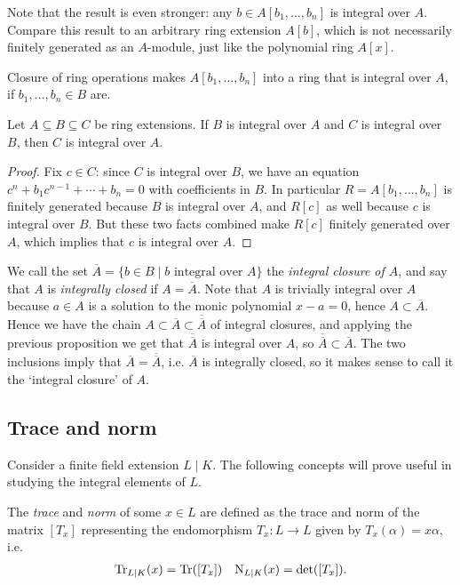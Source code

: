 Note that the result is even stronger: any $b\in A[b_1,\dots,b_n]$ is integral over $A$. Compare this result to an arbitrary ring extension $A[b]$, which is not necessarily finitely generated as an $A$-module, just like the polynomial ring $A[x]$.

Closure of ring operations makes $A[b_1,\dots,b_n]$ into a ring that is integral over $A$, if $b_1,\dots,b_n\in B$ are.

\begin{proposition}
	Let $A\subseteq B\subseteq C$ be ring extensions. If $B$ is integral over $A$ and $C$ is integral over $B$, then $C$ is integral over $A$.
\end{proposition}
\begin{proof}
	Fix $c\in C$: since $C$ is integral over $B$, we have an equation $c^n+b_1c^{n-1}+\cdots+b_n=0$ with coefficients in $B$. In particular $R=A[b_1,\dots,b_n]$ is finitely generated because $B$ is integral over $A$, and $R[c]$ as well because $c$ is integral over $B$. But these two facts combined make $R[c]$ finitely generated over $A$, which implies that $c$ is integral over $A$.
\end{proof}

We call the set $\overline{A}=\{b\in B \mid b \text{ integral over } A\}$ the \emph{integral closure of $A$}, and say that $A$ is \emph{integrally closed} if $A=\overline{A}$. Note that $A$ is trivially integral over $A$ because $a\in A$ is a solution to the monic polynomial $x-a=0$, hence $A\subset\overline{A}$. Hence we have the chain $A\subset \overline{A}\subset\overline{\overline{A}}$ of integral closures, and applying the previous proposition we get that $\overline{\overline{A}}$ is integral over $A$, so $\overline{\overline{A}}\subset\overline{A}$. The two inclusions imply that $\overline{A}=\overline{\overline{A}}$, i.e. $\overline{A}$ is integrally closed, so it makes sense to call it the `integral closure' of $A$.


\subsection{Trace and norm}

Consider a finite field extension $L\mid K$. The following concepts will prove useful in studying the integral elements of $L$.

\begin{definition}
	The \emph{trace} and \emph{norm} of some $x\in L$ are defined as the trace and norm of the matrix $[T_x]$ representing the endomorphism $T_x:L\to L$ given by $T_x(\alpha)=x\alpha$, i.e.
	\begin{align*}
		\operatorname{Tr}_{L\mid K}(x) = \operatorname{Tr}([T_x]) & & \operatorname{N}_{L\mid K}(x) = \det([T_x]).
	\end{align*}
\end{definition}

